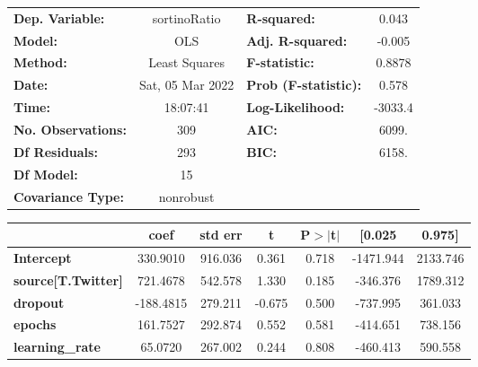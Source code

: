 \begin{center}
\begin{tabular}{lclc}
\toprule
\textbf{Dep. Variable:}              &   sortinoRatio   & \textbf{  R-squared:         } &     0.043   \\
\textbf{Model:}                      &       OLS        & \textbf{  Adj. R-squared:    } &    -0.005   \\
\textbf{Method:}                     &  Least Squares   & \textbf{  F-statistic:       } &    0.8878   \\
\textbf{Date:}                       & Sat, 05 Mar 2022 & \textbf{  Prob (F-statistic):} &    0.578    \\
\textbf{Time:}                       &     18:07:41     & \textbf{  Log-Likelihood:    } &   -3033.4   \\
\textbf{No. Observations:}           &         309      & \textbf{  AIC:               } &     6099.   \\
\textbf{Df Residuals:}               &         293      & \textbf{  BIC:               } &     6158.   \\
\textbf{Df Model:}                   &          15      & \textbf{                     } &             \\
\textbf{Covariance Type:}            &    nonrobust     & \textbf{                     } &             \\
\bottomrule
\end{tabular}
\begin{tabular}{lcccccc}
                                     & \textbf{coef} & \textbf{std err} & \textbf{t} & \textbf{P$> |$t$|$} & \textbf{[0.025} & \textbf{0.975]}  \\
\midrule
\textbf{Intercept}                   &     330.9010  &      916.036     &     0.361  &         0.718        &    -1471.944    &     2133.746     \\
\textbf{source[T.Twitter]}           &     721.4678  &      542.578     &     1.330  &         0.185        &     -346.376    &     1789.312     \\
\textbf{dropout}                     &    -188.4815  &      279.211     &    -0.675  &         0.500        &     -737.995    &      361.033     \\
\textbf{epochs}                      &     161.7527  &      292.874     &     0.552  &         0.581        &     -414.651    &      738.156     \\
\textbf{learning\_rate}              &      65.0720  &      267.002     &     0.244  &         0.808        &     -460.413    &      590.558     \\

\end{tabular}
\end{center}
